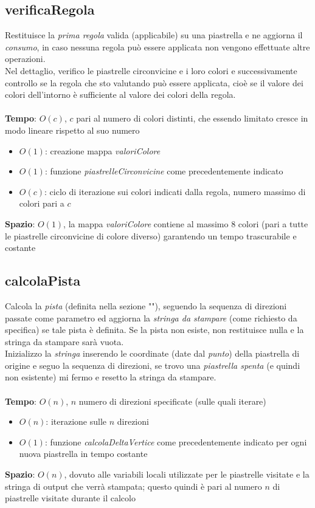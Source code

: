 \documentclass{article}
\begin{document}
\subsection{verificaRegola}\label{subsec:checkRule}
Restituisce la \textit{prima regola} valida (applicabile) su una piastrella e ne aggiorna il \textit{consumo}, in caso nessuna regola può essere applicata non vengono effettuate altre operazioni.\\
Nel dettaglio, verifico le piastrelle circonvicine e i loro colori e successivamente controllo se la regola che sto valutando può essere applicata, cioè se il valore dei colori dell'intorno è sufficiente al valore dei colori della regola.\\ \\
\textbf{Tempo}: \(O(c)\), \(c\) pari al numero di colori distinti, che essendo limitato cresce in modo lineare rispetto al suo numero\\
\begin{itemize}
  \item \(O(1)\): creazione mappa \textit{valoriColore}
  \item \(O(1)\): funzione \textit{piastrelleCirconvicine} come precedentemente indicato
  \item \(O(c)\): ciclo di iterazione sui colori indicati dalla regola, numero massimo di colori pari a \(c\)
\end{itemize}
\textbf{Spazio}: \(O(1)\), la mappa \textit{valoriColore} contiene al massimo 8 colori (pari a tutte le piastrelle circonvicine di colore diverso) garantendo un tempo trascurabile e costante

\subsection{calcolaPista}\label{subsec:getPista}
Calcola la \textit{pista} (definita nella sezione ""), seguendo la sequenza di direzioni passate come parametro ed aggiorna la \textit{stringa da stampare} (come richiesto da specifica) se tale pista è definita. Se la pista non esiste, non restituisce nulla e la stringa da stampare sarà vuota.\\
Inizializzo la \textit{stringa} inserendo le coordinate (date dal \textit{punto}) della piastrella di origine e seguo la sequenza di direzioni, se trovo una \textit{piastrella spenta} (e quindi non esistente) mi fermo e resetto la stringa da stampare.\\ \\
\textbf{Tempo}: \(O(n)\), \(n\) numero di direzioni specificate (sulle quali iterare)\\
\begin{itemize}
  \item \(O(n)\): iterazione sulle \(n\) direzioni
  \item \(O(1)\): funzione \textit{calcolaDeltaVertice} come precedentemente indicato per ogni nuova piastrella in tempo costante
\end{itemize}
\textbf{Spazio}: \(O(n)\), dovuto alle variabili locali utilizzate per le piastrelle visitate e la stringa di output che verrà stampata; questo quindi è pari al numero \(n\) di piastrelle visitate durante il calcolo
\end{document}
